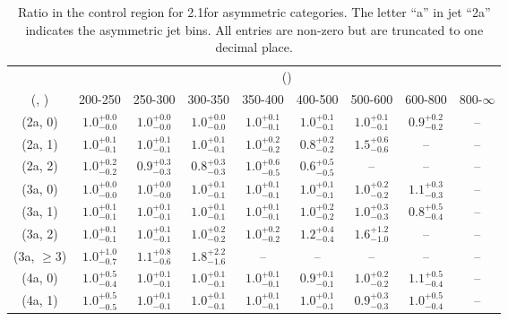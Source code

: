 \begin{table}[h!]
\tiny
\centering
\caption{Ratio in the \mj control region for 2.1\ifb for asymmetric categories. The letter ``a'' in jet \eg ``2a''  indicates the asymmetric jet bins. All entries are non-zero but are truncated to one decimal place.\label{tab:ratiosepnaive_mu_ewk_asym}}
\begin{tabular}
{ccccccccc}
	\hline\hline
	& \multicolumn{8}{c}{\scalht (\gev)} \\ 
	 (\njet,  \nb) & 200-250 & 250-300 & 300-350 & 350-400 & 400-500 & 500-600 & 600-800 & 800-$\infty$ \\ [0.8ex] 
\hline
	(2a, 0) & $1.0^{+ 0.0 }_{- 0.0 }$ & $1.0^{+ 0.0 }_{- 0.0 }$ & $1.0^{+ 0.0 }_{- 0.0 }$ & $1.0^{+ 0.1 }_{- 0.1 }$ & $1.0^{+ 0.1 }_{- 0.1 }$ & $1.0^{+ 0.1 }_{- 0.1 }$ & $0.9^{+ 0.2 }_{- 0.2 }$ & -- \\[0.5ex] 
	(2a, 1) & $1.0^{+ 0.1 }_{- 0.1 }$ & $1.0^{+ 0.1 }_{- 0.1 }$ & $1.0^{+ 0.1 }_{- 0.1 }$ & $1.0^{+ 0.2 }_{- 0.2 }$ & $0.8^{+ 0.2 }_{- 0.2 }$ & $1.5^{+ 0.6 }_{- 0.6 }$ & -- & -- \\[0.5ex] 
	(2a, 2) & $1.0^{+ 0.2 }_{- 0.2 }$ & $0.9^{+ 0.3 }_{- 0.3 }$ & $0.8^{+ 0.3 }_{- 0.3 }$ & $1.0^{+ 0.6 }_{- 0.5 }$ & $0.6^{+ 0.5 }_{- 0.5 }$ & -- & -- & -- \\[0.5ex] 
	(3a, 0) & $1.0^{+ 0.0 }_{- 0.0 }$ & $1.0^{+ 0.0 }_{- 0.0 }$ & $1.0^{+ 0.1 }_{- 0.1 }$ & $1.0^{+ 0.1 }_{- 0.1 }$ & $1.0^{+ 0.1 }_{- 0.1 }$ & $1.0^{+ 0.2 }_{- 0.2 }$ & $1.1^{+ 0.3 }_{- 0.3 }$ & -- \\[0.5ex] 
	(3a, 1) & $1.0^{+ 0.1 }_{- 0.1 }$ & $1.0^{+ 0.1 }_{- 0.1 }$ & $1.0^{+ 0.1 }_{- 0.1 }$ & $1.0^{+ 0.1 }_{- 0.1 }$ & $1.0^{+ 0.2 }_{- 0.2 }$ & $1.0^{+ 0.3 }_{- 0.3 }$ & $0.8^{+ 0.5 }_{- 0.4 }$ & -- \\[0.5ex] 
	(3a, 2) & $1.0^{+ 0.1 }_{- 0.1 }$ & $1.0^{+ 0.1 }_{- 0.1 }$ & $1.0^{+ 0.2 }_{- 0.2 }$ & $1.0^{+ 0.2 }_{- 0.2 }$ & $1.2^{+ 0.4 }_{- 0.4 }$ & $1.6^{+ 1.2 }_{- 1.0 }$ & -- & -- \\[0.5ex] 
	(3a, $\ge3$) & $1.0^{+ 1.0 }_{- 0.7 }$ & $1.1^{+ 0.8 }_{- 0.6 }$ & $1.8^{+ 2.2 }_{- 1.6 }$ & -- & -- & -- & -- & -- \\[0.5ex] 
	(4a, 0) & $1.0^{+ 0.5 }_{- 0.4 }$ & $1.0^{+ 0.1 }_{- 0.1 }$ & $1.0^{+ 0.1 }_{- 0.1 }$ & $1.0^{+ 0.1 }_{- 0.1 }$ & $0.9^{+ 0.1 }_{- 0.1 }$ & $1.0^{+ 0.2 }_{- 0.2 }$ & $1.1^{+ 0.5 }_{- 0.4 }$ & -- \\[0.5ex] 
	(4a, 1) & $1.0^{+ 0.5 }_{- 0.5 }$ & $1.0^{+ 0.1 }_{- 0.1 }$ & $1.0^{+ 0.1 }_{- 0.1 }$ & $1.0^{+ 0.1 }_{- 0.1 }$ & $1.0^{+ 0.1 }_{- 0.1 }$ & $0.9^{+ 0.3 }_{- 0.3 }$ & $1.0^{+ 0.5 }_{- 0.4 }$ & -- \\[0.5ex] 

\end{tabular}
\end{table}
